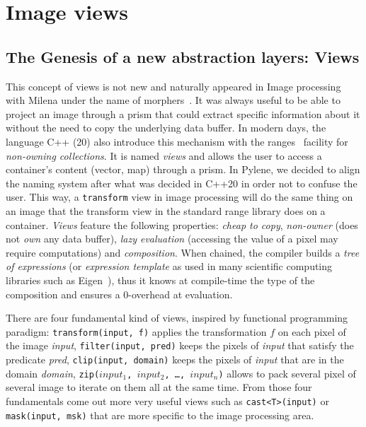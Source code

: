 \chapter{Image views}
\label{chap.image_views}

\section{The Genesis of a new abstraction layers: Views}

This concept of views is not new and naturally appeared in Image processing with Milena under the name of
morphers~\parencite{levillain.2009.ismm, geraud.2012.hdr}. It was always useful to be able to project an image through a
prism that could extract specific information about it without the need to copy the underlying data buffer. In modern
days, the language C++ (20) also introduce this mechanism with the ranges~\parencite{niebler.2014.ranges} facility for
\emph{non-owning collections}. It is named \emph{views} and allows the user to access a container's content (vector,
map) through a prism. In Pylene, we decided to align the naming system after what was decided in C++20 in order not to
confuse the user. This way, a \texttt{transform} view in image processing will do the same thing on an image that the
transform view in the standard range library does on a container. \emph{Views} feature the following properties:
\emph{cheap to copy}, \emph{non-owner} (does not \emph{own} any data buffer), \emph{lazy evaluation} (accessing the
value of a pixel may require computations) and \emph{composition}. When chained, the compiler builds a \emph{tree of
  expressions} (or \emph{expression template} as used in many scientific computing libraries such as
Eigen~\cite{guennebaud.2010.eigen}), thus it knows at compile-time the type of the composition and ensures a 0-overhead
at evaluation.

There are four fundamental kind of views, inspired by functional programming paradigm: \texttt{transform(input, f)}
applies the transformation $f$ on each pixel of the image \emph{input}, \texttt{filter(input, pred)} keeps the pixels of
\emph{input} that satisfy the predicate \emph{pred}, \texttt{clip(input, domain)} keeps the pixels of \emph{input}
that are in the domain \emph{domain}, \texttt{zip($input_1$, $input_2$, \ldots, $input_n$)} allows to pack several pixel
of several image to iterate on them all at the same time. From those four fundamentals come out more very useful views
such as \texttt{cast<T>(input)} or \texttt{mask(input, msk)} that are more specific to the image processing area.

